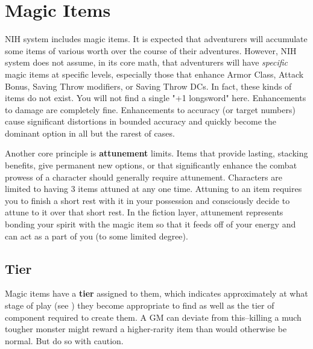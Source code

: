 \chapter{Magic Items}\label{ch:magic-items}

NIH system includes magic items. It is expected that adventurers will accumulate some items of various worth over the course of their adventures. However, NIH system does not assume, in its core math, that adventurers will have \textit{specific} magic items at specific levels, especially those that enhance Armor Class, Attack Bonus, Saving Throw modifiers, or Saving Throw DCs. In fact, these kinds of items do not exist. You will not find a single "+1 longsword" here. Enhancements to damage are completely fine. Enhancements to accuracy (or target numbers) cause significant distortions in bounded accuracy and quickly become the dominant option in all but the rarest of cases.

Another core principle is \textbf{attunement} limits. Items that provide lasting, stacking benefits, give permanent new options, or that significantly enhance the combat prowess of a character should generally require attunement. Characters are limited to having 3 items attuned at any one time. Attuning to an item requires you to finish a short rest with it in your possession and consciously decide to attune to it over that short rest. In the fiction layer, attunement represents bonding your spirit with the magic item so that it feeds off of your energy and can act as a part of you (to some limited degree).

\section{Tier}
Magic items have a \textbf{tier} assigned to them, which indicates approximately at what stage of play (see ) they become appropriate to find as well as the tier of component required to create them. A GM can deviate from this--killing a much tougher monster might reward a higher-rarity item than would otherwise be normal. But do so with caution.

